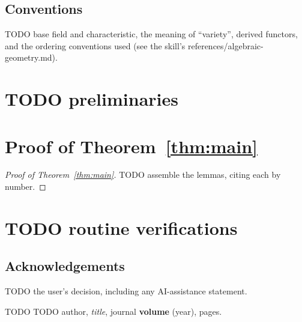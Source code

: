 \documentclass[11pt,reqno]{amsart}
\theoremstyle{plain}
\theoremstyle{definition}
\theoremstyle{remark}
\begin{document}
\subsection{Conventions}
TODO base field and characteristic, the meaning of ``variety'', derived
functors, and the ordering conventions used (see the skill's
references/algebraic-geometry.md).

\section{TODO preliminaries}\label{sec:prelim}

\section{Proof of Theorem~\ref{thm:main}}\label{sec:proof}

\begin{proof}[Proof of Theorem~\ref{thm:main}]
TODO assemble the lemmas, citing each by number.
\end{proof}

\appendix
\section{TODO routine verifications}\label{app:routine}

\subsection*{Acknowledgements}
TODO the user's decision, including any AI-assistance statement.

\begin{thebibliography}{TODO}
TODO author, \emph{title}, journal \textbf{volume} (year), pages.
\end{thebibliography}
\end{document}
